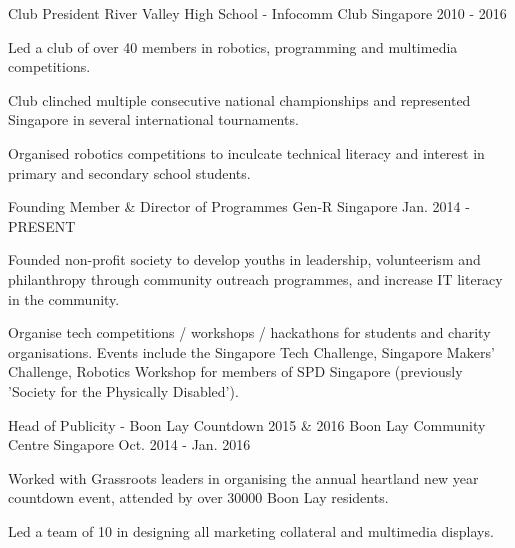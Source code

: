 

\begin{cventries}

  \cventry
    {Club President} %
    {River Valley High School - Infocomm Club} %
    {Singapore} %
    {2010 - 2016} %
    {
      \begin{cvitems} %
        \item {Led a club of over 40 members in robotics, programming and multimedia competitions.}
        \item {Club clinched multiple consecutive national championships and represented Singapore in several international tournaments.}
        \item {Organised robotics competitions to inculcate technical literacy and interest in primary and secondary school students.}
      \end{cvitems}
    }

  \cventry
    {Founding Member \& Director of Programmes} %
    {Gen-R} %
    {Singapore} %
    {Jan. 2014 - PRESENT} %
    {
      \begin{cvitems} %
        \item {Founded non-profit society to develop youths in leadership, volunteerism and philanthropy through community outreach programmes, and increase IT literacy in the community.}
        \item {Organise tech competitions / workshops / hackathons for students and charity organisations. Events include the Singapore Tech Challenge, Singapore Makers' Challenge, Robotics Workshop for members of SPD Singapore (previously 'Society for the Physically Disabled').}
      \end{cvitems}
    }

  \cventry
    {Head of Publicity - Boon Lay Countdown 2015 \& 2016} %
    {Boon Lay Community Centre} %
    {Singapore} %
    {Oct. 2014 - Jan. 2016} %
    {
      \begin{cvitems} %
        \item {Worked with Grassroots leaders in organising the annual heartland new year countdown event, attended by over 30000 Boon Lay residents.}
        \item {Led a team of 10 in designing all marketing collateral and multimedia displays.}
      \end{cvitems}
    }


\end{cventries}
